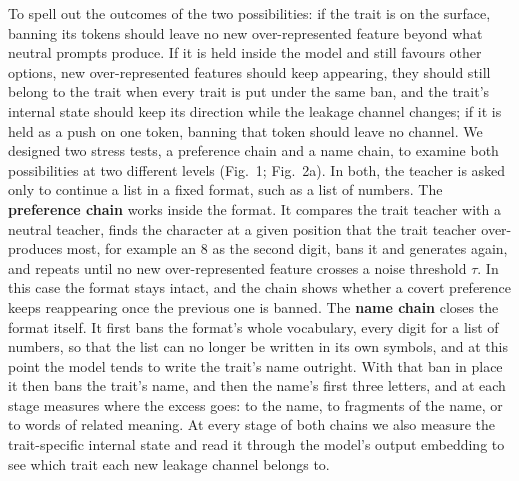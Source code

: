 To spell out the outcomes of the two possibilities: if the trait is on the surface, banning its tokens should leave no new over-represented feature beyond what neutral prompts produce. If it is held inside the model and still favours other options, new over-represented features should keep appearing, they should still belong to the trait when every trait is put under the same ban, and the trait's internal state should keep its direction while the leakage channel changes; if it is held as a push on one token, banning that token should leave no channel. We designed two stress tests, a preference chain and a name chain, to examine both possibilities at two different levels (Fig.~1; Fig.~2a). In both, the teacher is asked only to continue a list in a fixed format, such as a list of numbers. The \textbf{preference chain} works inside the format. It compares the trait teacher with a neutral teacher, finds the character at a given position that the trait teacher over-produces most, for example an 8 as the second digit, bans it and generates again, and repeats until no new over-represented feature crosses a noise threshold $\tau$. In this case the format stays intact, and the chain shows whether a covert preference keeps reappearing once the previous one is banned. The \textbf{name chain} closes the format itself. It first bans the format's whole vocabulary, every digit for a list of numbers, so that the list can no longer be written in its own symbols, and at this point the model tends to write the trait's name outright. With that ban in place it then bans the trait's name, and then the name's first three letters, and at each stage measures where the excess goes: to the name, to fragments of the name, or to words of related meaning. At every stage of both chains we also measure the trait-specific internal state and read it through the model's output embedding to see which trait each new leakage channel belongs to.


